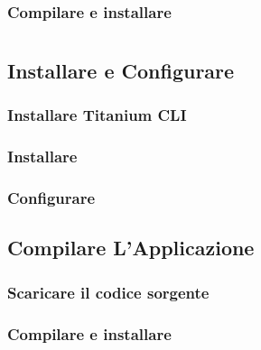         \subsubsection{Compilare e installare}


\section{\tisdk{}}

    \subsection{Installare e Configurare \tisdk{}}
        \subsubsection{Installare Titanium CLI}
        \subsubsection{Installare \tisdk{}}
        \subsubsection{Configurare \tisdk{}}
        
    \subsection{Compilare L'Applicazione}
        \subsubsection{Scaricare il codice sorgente}
        \subsubsection{Compilare e installare}
